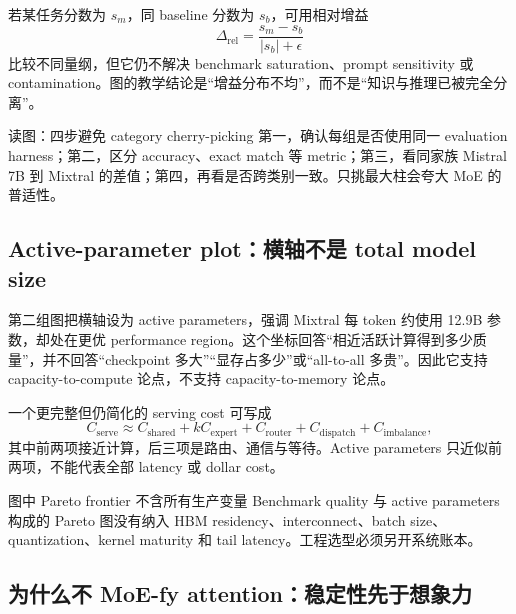 若某任务分数为 $s_m$，同 baseline 分数为 $s_b$，可用相对增益
\[
\Delta_{\mathrm{rel}}=\frac{s_m-s_b}{|s_b|+\epsilon}
\]
比较不同量纲，但它仍不解决 benchmark saturation、prompt sensitivity 或 contamination。图的教学结论是“增益分布不均”，而不是“知识与推理已被完全分离”。

\begin{knowledgebox}{读图：四步避免 category cherry-picking}
第一，确认每组是否使用同一 evaluation harness；第二，区分 accuracy、exact match 等 metric；第三，看同家族 Mistral 7B 到 Mixtral 的差值；第四，再看是否跨类别一致。只挑最大柱会夸大 MoE 的普适性。
\end{knowledgebox}

\subsection{Active-parameter plot：横轴不是 total model size}

第二组图把横轴设为 active parameters，强调 Mixtral 每 token 约使用 12.9B 参数，却处在更优 performance region。这个坐标回答“相近活跃计算得到多少质量”，并不回答“checkpoint 多大”“显存占多少”或“all-to-all 多贵”。因此它支持 capacity-to-compute 论点，不支持 capacity-to-memory 论点。


一个更完整但仍简化的 serving cost 可写成
\[
C_{\text{serve}}\approx C_{\text{shared}}+kC_{\text{expert}}+C_{\text{router}}+C_{\text{dispatch}}+C_{\text{imbalance}},
\]
其中前两项接近计算，后三项是路由、通信与等待。Active parameters 只近似前两项，不能代表全部 latency 或 dollar cost。

\begin{warningbox}{图中 Pareto frontier 不含所有生产变量}
Benchmark quality 与 active parameters 构成的 Pareto 图没有纳入 HBM residency、interconnect、batch size、quantization、kernel maturity 和 tail latency。工程选型必须另开系统账本。
\end{warningbox}


\subsection{为什么不 MoE-fy attention：稳定性先于想象力}

